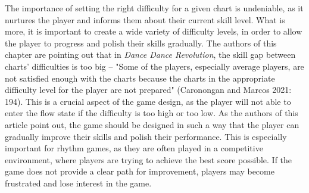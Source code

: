 The importance of setting the right difficulty for a given chart is undeniable, as it nurtures the player and informs them about their current skill level. What is more, it is important to create a wide variety of difficulty levels, in order to allow the player to progress and polish their skills gradually. The authors of this chapter are pointing out that in \textit{Dance Dance Revolution}, the skill gap between charts' difficulties is too big -- "Some of the players, especially average players, are not satisfied enough with the charts because the charts in the appropriate difficulty level for the player are not prepared" (Caronongan and Marcos 2021: 194). This is a crucial aspect of the game design, as the player will not able to enter the flow state if the difficulty is too high or too low. As the authors of this article point out, the game should be designed in such a way that the player can gradually improve their skills and polish their performance. This is especially important for rhythm games, as they are often played in a competitive environment, where players are trying to achieve the best score possible. If the game does not provide a clear path for improvement, players may become frustrated and lose interest in the game.

